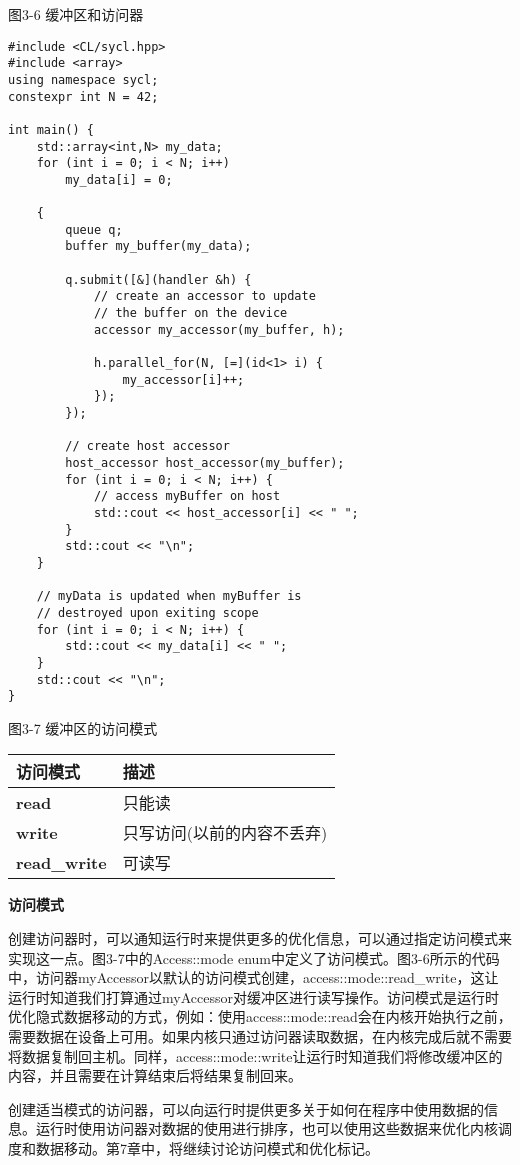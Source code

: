 \hspace*{\fill} \par %
图3-6 缓冲区和访问器
\begin{lstlisting}[caption={}]
#include <CL/sycl.hpp>
#include <array>
using namespace sycl;
constexpr int N = 42;

int main() {
	std::array<int,N> my_data;
	for (int i = 0; i < N; i++)
		my_data[i] = 0;
	
	{
		queue q;
		buffer my_buffer(my_data);
		
		q.submit([&](handler &h) {
			// create an accessor to update
			// the buffer on the device
			accessor my_accessor(my_buffer, h);
			
			h.parallel_for(N, [=](id<1> i) {
				my_accessor[i]++;
			});
		});
	
		// create host accessor
		host_accessor host_accessor(my_buffer);
		for (int i = 0; i < N; i++) {
			// access myBuffer on host
			std::cout << host_accessor[i] << " ";
		}
		std::cout << "\n";
	}

	// myData is updated when myBuffer is
	// destroyed upon exiting scope
	for (int i = 0; i < N; i++) {
		std::cout << my_data[i] << " ";
	}
	std::cout << "\n";
}
\end{lstlisting}

\hspace*{\fill} \par %
图3-7 缓冲区的访问模式
\begin{table}[H]
	\begin{tabular}{|l|l|}
		\hline
		\textbf{访问模式} & \textbf{描述}                                \\ \hline
		\textbf{read}        & 只能读                                   \\ \hline
		\textbf{write}       & 只写访问(以前的内容不丢弃) \\ \hline
		\textbf{read\_write} & 可读写              \\ \hline
	\end{tabular}
\end{table}

\hspace*{\fill} \par %
\textbf{访问模式}

创建访问器时，可以通知运行时来提供更多的优化信息，可以通过指定访问模式来实现这一点。图3-7中的Access::mode enum中定义了访问模式。图3-6所示的代码中，访问器myAccessor以默认的访问模式创建，access::mode::read\_write，这让运行时知道我们打算通过myAccessor对缓冲区进行读写操作。访问模式是运行时优化隐式数据移动的方式，例如：使用access::mode::read会在内核开始执行之前，需要数据在设备上可用。如果内核只通过访问器读取数据，在内核完成后就不需要将数据复制回主机。同样，access::mode::write让运行时知道我们将修改缓冲区的内容，并且需要在计算结束后将结果复制回来。\par

创建适当模式的访问器，可以向运行时提供更多关于如何在程序中使用数据的信息。运行时使用访问器对数据的使用进行排序，也可以使用这些数据来优化内核调度和数据移动。第7章中，将继续讨论访问模式和优化标记。\par










